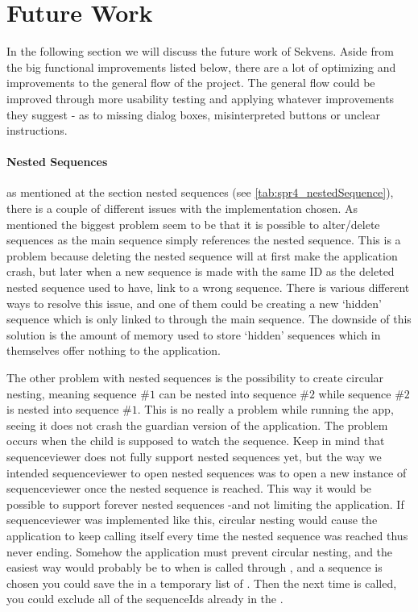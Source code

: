 \section{Future Work}\label{sec:future_work}

In the following section we will discuss the future work of Sekvens. Aside from the big functional improvements listed below, there are a lot of optimizing and improvements to the general flow of the project. The general flow could be improved through more usability testing and applying whatever improvements they suggest - as to missing dialog boxes, misinterpreted buttons or unclear instructions.

\paragraph{Nested Sequences} as mentioned at the section nested sequences (see \ref{tab:spr4_nestedSequence}), there is a couple of different issues with the implementation chosen. As mentioned the biggest problem seem to be that it is possible to alter/delete sequences as the main sequence simply references the nested sequence. This is a problem because deleting the nested sequence will at first make the application crash, but later when a new sequence is made with the same ID as the deleted nested sequence used to have, link to a wrong sequence. There is various different ways to resolve this issue, and one of them could be creating a new `hidden' sequence which is only linked to through the main sequence. The downside of this solution is the amount of memory used to store `hidden' sequences which in themselves offer nothing to the application.

The other problem with nested sequences is the possibility to create circular nesting, meaning sequence $\#1$ can be nested into sequence $\#2$ while sequence $\#2$ is nested into sequence $\#1$. This is no really a problem while running the app, seeing it does not crash the guardian version of the application. The problem occurs when the child is supposed to watch the sequence. Keep in mind that sequenceviewer does not fully support nested sequences yet, but the way we intended sequenceviewer to open nested sequences was to open a new instance of sequenceviewer once the nested sequence is reached. This way it would be possible to support forever nested sequences -and not limiting the application. If sequenceviewer was implemented like this, circular nesting would cause the application to keep calling itself every time the nested sequence was reached thus never ending. Somehow the application must prevent circular nesting, and the easiest way would probably be to when  is called through , and a sequence is chosen you could save the  in a temporary list of . Then the next time  is called, you could exclude all of the sequenceIds already in the .

